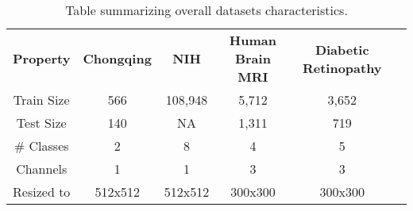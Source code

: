 \begin{table}[H]
\centering
\small
\begin{tabular}{cccccc}
\hline
\multirow{2}{*}{\textbf{Property}} & \multirow{2}{*}{\textbf{Chongqing}} & \multirow{2}{*}{\textbf{NIH}} & \multirow{2}{*}{\textbf{Human Brain MRI}} & \multirow{2}{*}{\textbf{Diabetic Retinopathy}} \\ 
 &  &  &  &  \\ 
\hline
Train Size & 566 & 108,948 & 5,712 & 3,652 \\ 
Test Size & 140 & NA & 1,311 & 719 \\ 
\# Classes & 2 & 8 & 4 & 5 \\ 
Channels & 1 & 1 & 3 & 3 \\ 
Resized to & 512x512 & 512x512 & 300x300 & 300x300 \\ 
\hline
\end{tabular}
\caption{Table summarizing overall datasets characteristics.}
\label{tab:datasets_summary}
\end{table}

